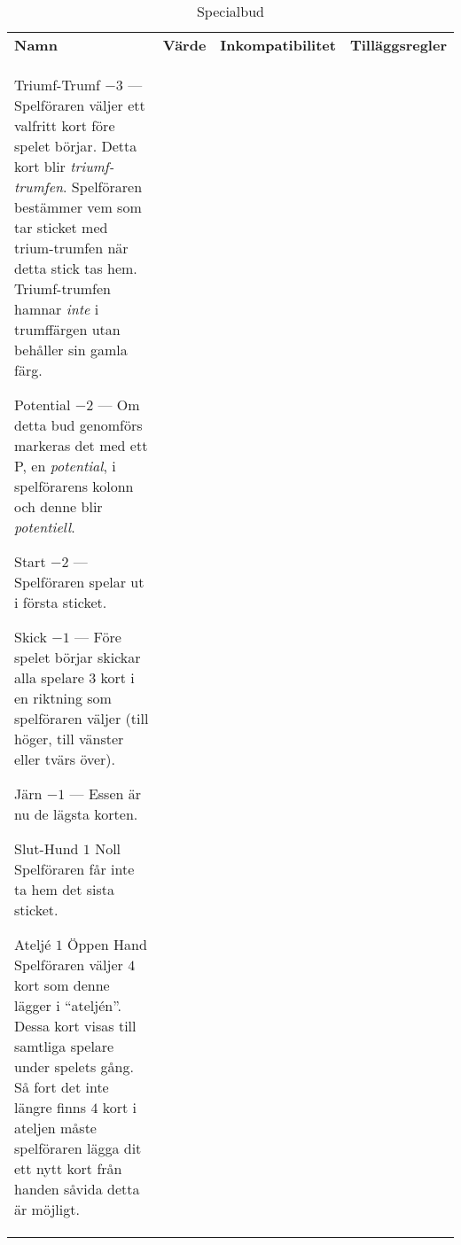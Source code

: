 %
%
%

\newcommand{\nonTrump}{\textnormal{icke-trumf-bud}}

\begin{table}
	\caption{Specialbud}\label{tab:specialBids}
	\begin{center}
		\begin{tabularx}{\textwidth}{lcp{3cm}|X}
			\textbf{Namn} &
			\textbf{Värde} &
			\textbf{Inkompatibilitet} &
			\textbf{Tilläggsregler}
			\\[-3ex]

			\specialBidItem%
			{Triumf-Trumf}
			{$-3$}
			{---}
			{%
				Spelföraren väljer ett valfritt kort före spelet börjar. Detta kort blir \emph{triumf-trumfen}. Spelföraren bestämmer vem som tar sticket med trium-trumfen när detta stick tas hem. Triumf-trumfen hamnar \emph{inte} i trumffärgen utan behåller sin gamla färg.
			}

			\specialBidItem%
			{Potential}
			{$-2$}
			{---}
			{%
				Om detta bud genomförs markeras det med ett P, en \emph{potential}, i spelförarens kolonn och denne blir \emph{potentiell}.
			}

			\specialBidItem%
			{Start}
			{$-2$}
			{---}
			{%
				Spelföraren spelar ut i första sticket.
			}

			\specialBidItem%
			{Skick}
			{$-1$}
			{---}
			{%
				Före spelet börjar skickar alla spelare $3$ kort i en riktning som spelföraren väljer (till höger, till vänster eller tvärs över).
			}

			\specialBidItem%
			{Järn}
			{$-1$}
			{---}
			{%
				Essen är nu de lägsta korten.
			}

			\specialBidItem%
			{Slut-Hund}
			{$1$}
			{Noll}
			{%
				Spelföraren får inte ta hem det sista sticket.
			}

			\specialBidItem%
			{Ateljé}
			{$1$}
			{Öppen Hand}
			{%
				Spelföraren väljer $4$ kort som denne lägger i ``ateljén''. Dessa kort visas till samtliga spelare under spelets gång. Så fort det inte längre finns $4$ kort i ateljen måste spelföraren lägga dit ett nytt kort från handen såvida detta är möjligt.
			}


\end{tabularx}
\end{center}
\end{table}
